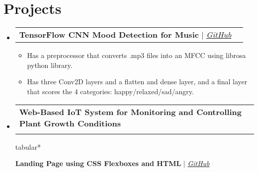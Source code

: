\documentclass[letterpaper, 11pt]{article}
\makeatletter
\newcommand{\resumeItem}[1]{
  \item\small{
    {#1 \vspace{-2pt}}
  }
}
\newcommand{\resumeProjectHeading}[2]{
    \vspace{-2pt}\item
    \begin{tabular*}{0.97\textwidth}{l@{\extracolsep{\fill}}r}
      \small#1 & #2 \\
    \end{tabular*}\vspace{-7pt}
}
\newcommand{\resumeSubHeadingListStart}{\begin{itemize}[leftmargin=0.15in, label={}]}
\newcommand{\resumeSubHeadingListEnd}{\end{itemize}}
\newcommand{\resumeItemListStart}{\begin{itemize}}
\newcommand{\resumeItemListEnd}{\end{itemize}\vspace{-5pt}}
\makeatother
\begin{document}
\section{Projects}
\vspace{-3pt}
\resumeSubHeadingListStart
  \resumeProjectHeading
    {\textbf{TensorFlow CNN Mood Detection for Music} $|$ \emph{\href{https://github.com/hamzah-mujawar/Mood_Detection_CNN_Using_Tensorflow}{\color{blue}GitHub}}}{}
      \resumeItemListStart
        \resumeItem{Has a preprocessor that converts .mp3 files into an MFCC using librosa python library.}
        \resumeItem{Has three Conv2D layers and a flatten and dense layer, and a final layer that scores the 4 categories: happy/relaxed/sad/angry.}
      \resumeItemListEnd
  \resumeProjectHeading
    {\textbf{Web-Based IoT System for Monitoring and Controlling Plant Growth Conditions}}
  
  \resumeProjectHeading
    {\textbf{Landing Page using CSS Flexboxes and HTML} $|$ \emph{\href{https://github.com/hamzah-mujawar/Landing-Page}{\color{blue}GitHub}}}{}





\resumeSubHeadingListEnd
\end{document}
